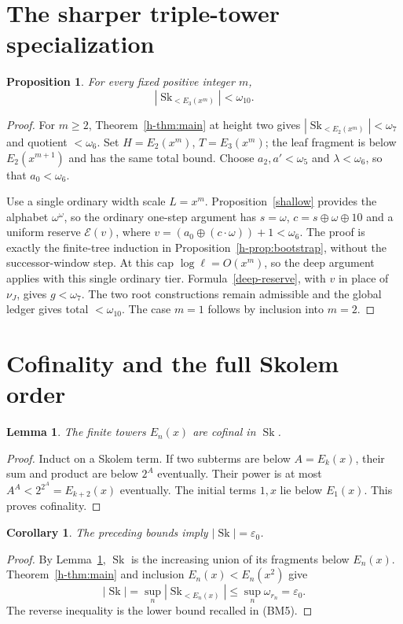 \documentclass[11pt]{article}
\newtheorem{lemma}[theorem]{Lemma}
\newtheorem{proposition}[theorem]{Proposition}
\newtheorem{corollary}[theorem]{Corollary}
\theoremstyle{definition}
\theoremstyle{remark}
\newcommand{\Sk}{\operatorname{Sk}}
\newcommand{\hs}{\mathbin{\oplus}}
\newcommand{\EE}{\mathcal E}
\numberwithin{equation}{section}
\begin{document}
\section{The sharper triple-tower specialization}
\begin{proposition}\label{triple-sharp}
For every fixed positive integer $m$,
\[
 |\Sk_{<E_3(x^m)}|<\omega_{10}.
\]
\end{proposition}
\begin{proof}
For $m\ge2$, Theorem~\ref{h-thm:main} at height two gives
$|\Sk_{<E_2(x^m)}|<\omega_7$ and quotient $<\omega_6$.
Set $H=E_2(x^m)$, $T=E_3(x^m)$; the leaf fragment is below
$E_2(x^{m+1})$ and has the same total bound.
Choose $a_2,a'<\omega_5$ and $\lambda<\omega_6$, so that
$a_0<\omega_6$.

Use a single ordinary width scale $L=x^m$. Proposition~\ref{shallow}
provides the alphabet $\omega^\omega$, so the ordinary one-step
argument has $s=\omega$, $c=s\hs\omega\hs10$ and a uniform
reserve $\EE(v)$, where $v=(a_0\hs(c\cdot\omega))+1<\omega_6$.
The proof is exactly the finite-tree induction in
Proposition~\ref{h-prop:bootstrap}, without the successor-window
step. At this cap $\log\ell=O(x^m)$, so the deep argument applies
with this single ordinary tier. Formula~\eqref{deep-reserve},
with $v$ in place of $\nu_J$, gives $g<\omega_7$.
The two root constructions remain admissible and the global
ledger gives total $<\omega_{10}$.
The case $m=1$ follows by inclusion into $m=2$.
\end{proof}

\section{Cofinality and the full Skolem order}
\begin{lemma}\label{cofinal}
The finite towers $E_n(x)$ are cofinal in $\Sk$.
\end{lemma}
\begin{proof}
Induct on a Skolem term. If two subterms are below $A=E_k(x)$,
their sum and product are below $2^A$ eventually. Their power is
at most $A^A<2^{2^A}=E_{k+2}(x)$ eventually. The initial terms
$1,x$ lie below $E_1(x)$. This proves cofinality.
\end{proof}
\begin{corollary}
The preceding bounds imply $|\Sk|=\varepsilon_0$.
\end{corollary}
\begin{proof}
By Lemma~\ref{cofinal}, $\Sk$ is the increasing union of its
fragments below $E_n(x)$. Theorem~\ref{h-thm:main} and inclusion
$E_n(x)<E_n(x^2)$ give
\[
 |\Sk|=\sup_n |\Sk_{<E_n(x)}|
 \le\sup_n\omega_{r_n}=\varepsilon_0.
\]
The reverse inequality is the lower bound recalled in (BM5).
\end{proof}
\end{document}
